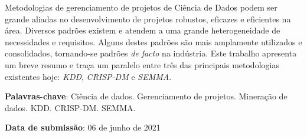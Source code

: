 \documentclass[
	article,			%
	11pt,				%
	oneside,			%
	a4paper,			%
	english,			%
	brazil,				%
	sumario=tradicional
	]{abntex2}
\begin{document}

\frenchspacing


%
%

\maketitle





\begin{resumoumacoluna}
 Metodologias de gerenciamento de projetos de Ciência de Dados podem ser grande
 aliadas no desenvolvimento de projetos robustos, eficazes e eficientes na área.
 Diversos padrões existem e atendem a uma grande heterogeneidade de necessidades
 e requisitos. Alguns destes padrões são mais amplamente utilizados e
 consolidados, tornando-se padrões \textit{de facto} na indústria. Este trabalho
 apresenta um breve resumo e traça um paralelo entre três das principais
 metodologias existentes hoje: \textit{KDD}, \textit{CRISP-DM} e \textit{SEMMA}.

 \vspace{\onelineskip}

 \noindent
 \textbf{Palavras-chave}: Ciência de dados. Gerenciamento de projetos. Mineração
 de dados. KDD. CRISP-DM. SEMMA.
\end{resumoumacoluna}

\begin{center}\smaller
\textbf{Data de submissão}: 06 de junho de 2021

\end{center}

\textual

\end{document}
